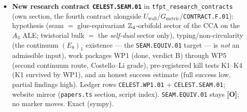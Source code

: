 \documentclass[11pt]{article}
\providecommand{\mO}{\textbf{[O]}}\providecommand{\mX}{\textbf{[X]}}
\providecommand{\Aut}{\operatorname{Aut}}
\begin{document}
\begin{itemize}[leftmargin=1.5em]
killed three ways, the false glue breaks additivity on $3112/6720$ pairs, rigidity $=\Aut(\Z_4)$.
\item \textbf{New research contract \texttt{CELEST.SEAM.01}} in \texttt{tfpt\_research\_contracts} (own
section, the fourth contract alongside $U_{\mathrm{wall}}$/$G_{\mathrm{metric}}$/\texttt{CONTRACT.F.01}):
hypothesis (seam $=$ glue-equivariant $\mathbb{Z}_4$-orbifold sector of the CCA on the $A_3$ ALE; twistorial bulk $=$
the \emph{self-dual} sector only), typing/non-circularity (the continuum $(E_8)_1$ existence --- the
\texttt{SEAM.EQUIV.01} target --- is \emph{not} an admissible input), work packages WP1 (done, verdict B)
through WP5 (second continuum route, Costello--Li grade), pre-registered kill tests K1--K4 (K1 survived by
WP1), and an honest success estimate (full success low, partial findings high). Ledger rows
\texttt{CELEST.WP1.01} $+$ \texttt{CELEST.SEAM.01}; website mirror (\texttt{papers.ts} section, script
index). \texttt{SEAM.EQUIV.01} stays \mO; no marker moves. Exact (sympy).
\end{itemize}
\end{document}
